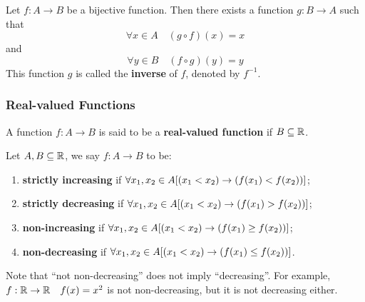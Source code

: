 \begin{definition}
    Let $f:A\to B$ be a bijective function. Then there exists a function $g:B\to A$ such that
    \[
        \forall x \in A \quad (g\circ f)(x) = x
    \]
    and
    \[
        \forall y \in B \quad (f\circ g)(y) = y
    \]
    This function $g$ is called the \textbf{inverse} of $f$, denoted by $f^{-1}$.
\end{definition}

\subsubsection{Real-valued Functions}

\begin{definition}
    A function $f:A\to B$ is said to be a \textbf{real-valued function} if $B \subseteq \mathbb{R}$.
\end{definition}

\begin{theorem}
    Let $A,B\subseteq\mathbb{R}$, we say $f:A\to B$ to be:
    \begin{enumerate}
        \item \textbf{strictly increasing} if $\forall x_1, x_2 \in A [(x_1 < x_2) \rightarrow (f(x_1) < f(x_2))]$;
        \item \textbf{strictly decreasing} if $\forall x_1, x_2 \in A [(x_1 < x_2) \rightarrow (f(x_1) > f(x_2))]$;
        \item \textbf{non-increasing} if $\forall x_1, x_2 \in A [(x_1 < x_2) \rightarrow (f(x_1) \geq f(x_2))]$;
        \item \textbf{non-decreasing} if $\forall x_1, x_2 \in A [(x_1 < x_2) \rightarrow (f(x_1) \leq f(x_2))]$.
    \end{enumerate}
\end{theorem}

\begin{remark}
    Note that ``not non-decreasing'' does not imply ``decreasing''.
    For example, $f:\mathbb{R}\to\mathbb{R}\quad f(x) = x^2$ is not non-decreasing, but it is not decreasing either.
\end{remark}